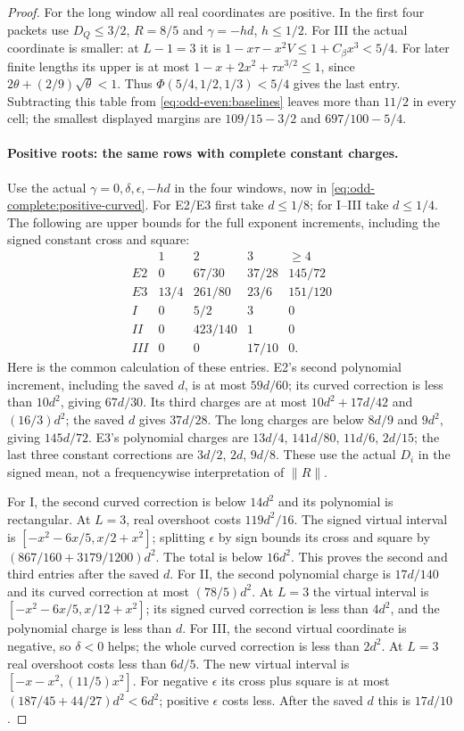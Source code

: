 \begin{proof}
For the long window all real coordinates are positive.
In the first four packets use $D_Q\le3/2$, $R=8/5$ and
$\gamma=-hd$, $h\le1/2$.
For III the actual coordinate is smaller: at $L-1=3$ it is
$1-x\tau-x^2V\le1+C_\beta x^3<5/4$.
For later finite lengths its upper is at most
$1-x+2x^2+\tau x^{3/2}\le1$, since
$2\theta+(2/9)\sqrt\theta<1$.
Thus $\Phi(5/4,1/2,1/3)<5/4$ gives the last entry.
Subtracting this table from \eqref{eq:odd-even:baselines} leaves
more than $11/2$ in every cell; the smallest displayed margins
are $109/15-3/2$ and $697/100-5/4$.

\paragraph{Positive roots: the same rows with complete constant charges.}
Use the actual $\gamma=0,\delta,\epsilon,-hd$ in the four
windows, now in \eqref{eq:odd-complete:positive-curved}.
For E2/E3 first take $d\le1/8$; for I--III take $d\le1/4$.
The following are upper bounds for the full exponent increments,
including the signed constant cross and square:
\begin{equation}\label{eq:odd-even:positive-expenses}
\begin{array}{c|cccc}
 &1&2&3&\ge4\\\hline
 E2&0&67/30&37/28&145/72\\
 E3&13/4&261/80&23/6&151/120\\
 I&0&5/2&3&0\\
 II&0&423/140&1&0\\
 III&0&0&17/10&0.
\end{array}
\end{equation}
Here is the common calculation of these entries. E2's second
polynomial increment, including the saved $d$, is at most $59d/60$;
its curved correction is less than $10d^2$, giving $67d/30$.
Its third charges are at most
$10d^2+17d/42$ and $(16/3)d^2$; the saved $d$ gives $37d/28$.
The long charges are below $8d/9$ and $9d^2$, giving $145d/72$.
E3's polynomial charges are $13d/4$, $141d/80$,
$11d/6$, $2d/15$; the last three constant corrections are
$3d/2$, $2d$, $9d/8$. These use the actual $D_i$ in the
signed mean, not a frequencywise interpretation of $\|R\|$.

For I, the second curved correction is below $14d^2$ and its
polynomial is rectangular. At $L=3$, real overshoot costs
$119d^2/16$. The signed virtual interval is
$[-x^2-6x/5,x/2+x^2]$; splitting $\epsilon$ by sign bounds
its cross and square by
$(867/160+3179/1200)d^2$. The total is below $16d^2$.
This proves the second and third entries after the saved $d$.
For II, the second polynomial charge is $17d/140$ and its
curved correction at most $(78/5)d^2$.
At $L=3$ the virtual interval is
$[-x^2-6x/5,x/12+x^2]$; its signed curved correction is
less than $4d^2$, and the polynomial charge is less than $d$.
For III, the second virtual coordinate is negative, so
$\delta<0$ helps; the whole curved correction is less than
$2d^2$. At $L=3$ real overshoot costs less than $6d/5$.
The new virtual interval is $[-x-x^2,(11/5)x^2]$.
For negative $\epsilon$ its cross plus square is at most
$(187/45+44/27)d^2<6d^2$; positive $\epsilon$ costs less.
After the saved $d$ this is $17d/10$.


\end{proof}
